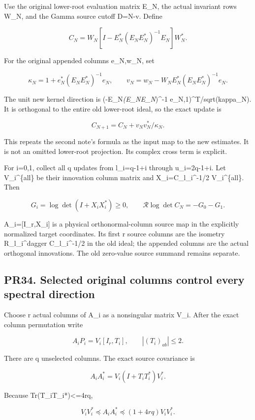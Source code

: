\documentclass[11pt]{article}
\begin{document}
Use the original lower-root evaluation matrix E\_N, the actual invariant rows W\_N, and the Gamma source cutoff D=N-v. Define

\[
C_N=W_N[I-E_N^*(E_NE_N^*)^{-1}E_N]W_N^*.
\]

For the original appended columns e\_N,w\_N, set

\[
\kappa_N=1+e_N^*(E_NE_N^*)^{-1}e_N,\qquad
v_N=w_N-W_NE_N^*(E_NE_N^*)^{-1}e_N.
\]

The unit new kernel direction is (-E\_N\emph{(E\_NE\_N})\^{}-1 e\_N,1)\^{}T/sqrt(kappa\_N). It is orthogonal to the entire old lower-root ideal, so the exact update is

\[
C_{N+1}=C_N+v_Nv_N^*/\kappa_N.
\tag{PR36}
\]

This repeats the second note's formula as the input map to the new estimates. It is not an omitted lower-root projection. Its complex cross term is explicit.

For i=0,1, collect all q updates from l\_i=q-1+i through u\_i=2q-1+i. Let V\_i\^{}\{all\} be their innovation column matrix and X\_i=C\_l\_i\^{}-1/2 V\_i\^{}\{all\}. Then

\[
G_i=\log\det(I+X_iX_i^*)\ge0,\qquad
\mathcal R\log\det C_N=-G_0-G_1.
\tag{PR37}
\]

A\_i={[}I\_r,X\_i{]} is a physical orthonormal-column source map in the explicitly normalized target coordinates. Its first r source columns are the isometry R\_l\_i\^{}dagger C\_l\_i\^{}-1/2 in the old ideal; the appended columns are the actual orthogonal innovations. The old zero-value source summand remains separate.

\subsection{PR34. Selected original columns control every spectral direction}\label{pr34.-selected-original-columns-control-every-spectral-direction}

Choose r actual columns of A\_i as a nonsingular matrix V\_i. After the exact column permutation write

\[
A_iP_i=V_i[I_r,T_i],\qquad |(T_i)_{ab}|\le2.
\tag{PR38}
\]

There are q unselected columns. The exact source covariance is

\[
A_iA_i^*=V_i(I+T_iT_i^*)V_i^*.
\]

Because Tr(T\_iT\_i*)\textless=4rq,

\[
\boxed{
V_iV_i^*\preceq A_iA_i^*\preceq(1+4rq)V_iV_i^*.
}
\tag{PR39}
\]
\end{document}
